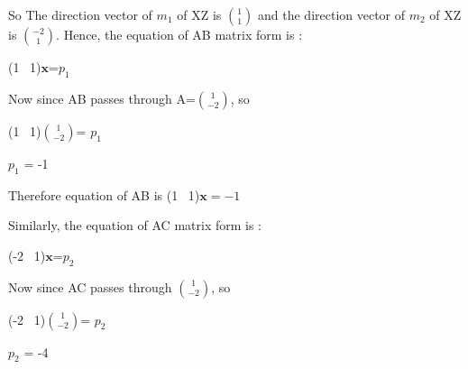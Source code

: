 \documentclass{beamer}
\begin{document}
\begin{frame}
\vspace{2 mm}
So The direction vector of $m_1$ of XZ is $\binom{1}{1}$
\vspace{2 mm}
and the direction vector of $m_2$ of XZ is $\binom{-2}{1}$.
\vspace{2 mm}
Hence, the equation of AB matrix form is : 
\vspace{2 mm}

\setlength{\parindent}{3.6cm}
(1 \ 1)$\boldsymbol{x}$=$p_1$
\vspace{2 mm}

\setlength{\parindent}{0cm}
Now since AB passes through A=$\binom{1}{-2}$, so
\vspace{2 mm}

\setlength{\parindent}{3.6cm}
(1 \ 1)$\binom{1}{-2}$= $p_1$
\vspace{2 mm}


$p_1$ = -1
\setlength{\parindent}{0cm}
\vspace{2 mm}


Therefore equation of AB is (1 \ 1)$\boldsymbol{x}=-1$


\vspace{2 mm}
Similarly, the equation of AC matrix form is : 
\vspace{2 mm}

\setlength{\parindent}{3.6cm}
(-2 \ 1)$\boldsymbol{x}$=$p_2$
\vspace{2 mm}

\setlength{\parindent}{0cm}
Now since AC passes through $\binom{1}{-2}$, so
\vspace{2 mm}

\setlength{\parindent}{3.6cm}
(-2 \ 1)$\binom{1}{-2}$= $p_2$
\vspace{2 mm}


$p_2$ = -4
\setlength{\parindent}{0cm}
\vspace{2 mm}


\end{frame}
\end{document}
